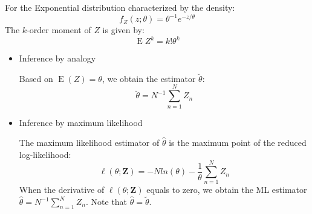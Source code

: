 \documentclass[conference,onecolumn]{IEEEtran}
\begin{document}
For the Exponential distribution characterized by the density:
\begin{equation}
f_Z(z;\theta) = \theta^{-1} e^{-z/\theta}
\end{equation}
The $k$-order moment of $Z$ is given by:
\begin{equation}
\operatorname{E}Z^k = k!\theta^k
\label{eq:MomExp}
\end{equation}

\begin{itemize}
	\item Inference by analogy

	Based on $\operatorname{E}(Z)= \theta$, we obtain the estimator $\breve{\theta}$:
	\begin{equation}
	\breve{\theta}= N^{-1}\sum_{n=1}^N Z_n
	\end{equation}

	
	\item Inference by maximum likelihood
	
	The maximum likelihood estimator of $\hat{\theta}$ is the maximum point of the reduced log-likelihood:
	\begin{equation}
	\ell(\theta;\bm Z) = -Nln(\theta)-\frac{1}{\theta}\sum_{n=1}^N Z_n
	\label{Eq:ReducedLogLikExp}
	\end{equation}
	When the derivative of $\ell(\theta;\bm Z)$ equals to zero, we obtain the ML estimator $\hat{\theta}=N^{-1}\sum_{n=1}^N Z_n$. Note that $\hat{\theta}=\breve{\theta}$.
\end{itemize}
\end{document}
